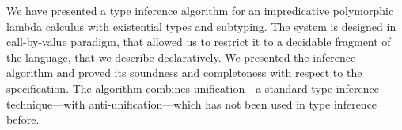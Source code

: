 We have presented a type inference algorithm for an impredicative polymorphic
lambda calculus with existential types and subtyping.
The system is designed in call-by-value paradigm, that allowed us to 
restrict it to a decidable fragment of the language,
that we describe declaratively. We presented the inference algorithm
and proved its soundness and completeness with respect to the specification.
The algorithm combines unification---a standard type inference technique---with
anti-unification---which has not been used in type inference before.
